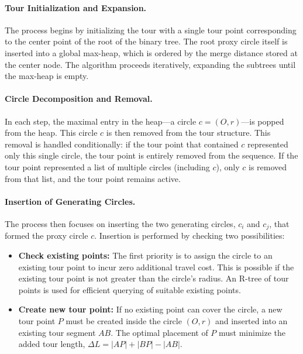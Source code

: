 \documentclass[11pt]{article}
\begin{document}
\paragraph{Tour Initialization and Expansion.}
The process begins by initializing the tour with a single tour point corresponding to the center point of the root of the binary tree. The root proxy circle itself is inserted into a global max-heap, which is ordered by the merge distance stored at the center node. The algorithm proceeds iteratively, expanding the subtrees until the max-heap is empty.

\paragraph{Circle Decomposition and Removal.}
In each step, the maximal entry in the heap---a circle $c = (O, r)$---is popped from the heap. This circle $c$ is then removed from the tour structure. This removal is handled conditionally: if the tour point that contained $c$ represented only this single circle, the tour point is entirely removed from the sequence. If the tour point represented a list of multiple circles (including $c$), only $c$ is removed from that list, and the tour point remains active.

\paragraph{Insertion of Generating Circles.}
The process then focuses on inserting the two generating circles, $c_i$ and $c_j$, that formed the proxy circle $c$. Insertion is performed by checking two possibilities:
\begin{itemize}
    \item \textbf{Check existing points:} The first priority is to assign the circle to an existing tour point to incur zero additional travel cost. This is possible if the existing tour point is not greater than the circle's radius. An R\*-tree of tour points is used for efficient querying of suitable existing points.
    \item \textbf{Create new tour point:} If no existing point can cover the circle, a new tour point $P$ must be created inside the circle $(O, r)$ and inserted into an existing tour segment $AB$. The optimal placement of $P$ must minimize the added tour length, $\Delta L = |AP| + |BP| - |AB|$.
\end{itemize}
\end{document}
